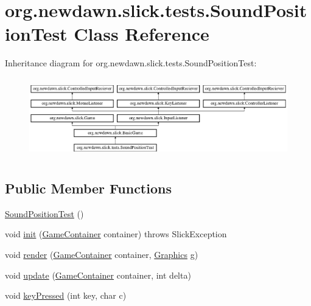 \hypertarget{classorg_1_1newdawn_1_1slick_1_1tests_1_1_sound_position_test}{}\section{org.\+newdawn.\+slick.\+tests.\+Sound\+Position\+Test Class Reference}
\label{classorg_1_1newdawn_1_1slick_1_1tests_1_1_sound_position_test}
Inheritance diagram for org.\+newdawn.\+slick.\+tests.\+Sound\+Position\+Test\+:\begin{figure}[H]
\begin{center}
\leavevmode
\includegraphics[height=3.522012cm]{classorg_1_1newdawn_1_1slick_1_1tests_1_1_sound_position_test}
\end{center}
\end{figure}
\subsection*{Public Member Functions}
\begin{DoxyCompactItemize}
\item 
\mbox{\hyperlink{classorg_1_1newdawn_1_1slick_1_1tests_1_1_sound_position_test_a9393035f9627e1f00c37d713d2d32107}{Sound\+Position\+Test}} ()
\item 
void \mbox{\hyperlink{classorg_1_1newdawn_1_1slick_1_1tests_1_1_sound_position_test_aaa4045baab87c36c541267a1d34a39ff}{init}} (\mbox{\hyperlink{classorg_1_1newdawn_1_1slick_1_1_game_container}{Game\+Container}} container)  throws Slick\+Exception 
\item 
void \mbox{\hyperlink{classorg_1_1newdawn_1_1slick_1_1tests_1_1_sound_position_test_a6acffa7d26fc7f9ec5913883ebd40ac0}{render}} (\mbox{\hyperlink{classorg_1_1newdawn_1_1slick_1_1_game_container}{Game\+Container}} container, \mbox{\hyperlink{classorg_1_1newdawn_1_1slick_1_1_graphics}{Graphics}} g)
\item 
void \mbox{\hyperlink{classorg_1_1newdawn_1_1slick_1_1tests_1_1_sound_position_test_af9544100baabfedae0c2787b218a2bad}{update}} (\mbox{\hyperlink{classorg_1_1newdawn_1_1slick_1_1_game_container}{Game\+Container}} container, int delta)
\item 
void \mbox{\hyperlink{classorg_1_1newdawn_1_1slick_1_1tests_1_1_sound_position_test_a3db7ea8dabda7d8bf211df4944993913}{key\+Pressed}} (int key, char c)
\end{DoxyCompactItemize}
